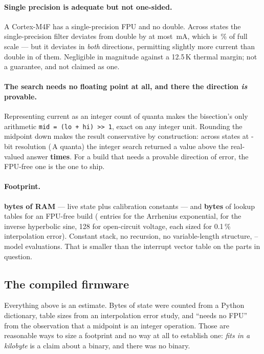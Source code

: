 \documentclass[11pt,letterpaper]{article}
\theoremstyle{definition}
\theoremstyle{remark}
\begin{document}
\paragraph{Single precision is adequate but not one-sided.} A Cortex-M4F has a
single-precision FPU and no double. Across \embSpStates{} states the single-precision filter
deviates from double by at most \embSpWorstmA\,mA, which is \embSpFrac\,\% of full scale ---
but it deviates in \emph{both} directions, permitting slightly more current than double in
\embSpLooseCount{} of them. Negligible in magnitude against a 12.5\,K thermal margin; not a
guarantee, and not claimed as one.

\paragraph{The search needs no floating point at all, and there the direction \emph{is}
provable.} Representing current as an integer count of quanta makes the bisection's only
arithmetic \texttt{mid = (lo + hi) >> 1}, exact on any integer unit. Rounding the midpoint down
makes the result conservative by construction: across \embIntStates{} states at
\embIntBits{}-bit resolution (\embIntQuantum\,A quanta) the integer search returned a value
above the real-valued answer \textbf{\embIntAbove{} times}. For a build that needs a provable
direction of error, the FPU-free one is the one to ship.

\paragraph{Footprint.} \textbf{\embRam{} bytes of RAM} --- live state plus \embConstants{}
calibration constants --- and \textbf{\embFlash{} bytes} of lookup tables for an FPU-free build
(\embLutExp{} entries for the Arrhenius exponential, \embLutAsinh{} for the inverse hyperbolic
sine, 128 for open-circuit voltage, each sized for 0.1\,\% interpolation error). Constant stack,
no recursion, no variable-length structure, \evalCharge{}--\evalDischarge{} model evaluations.
That is smaller than the interrupt vector table on the parts in question.



\subsection{The compiled firmware}\label{sec:firmware}

Everything above is an estimate. Bytes of state were counted from a Python dictionary, table
sizes from an interpolation error study, and ``needs no FPU'' from the observation that a
midpoint is an integer operation. Those are reasonable ways to size a footprint and no way at
all to establish one: \emph{fits in a kilobyte} is a claim about a binary, and there was no
binary.
\end{document}
